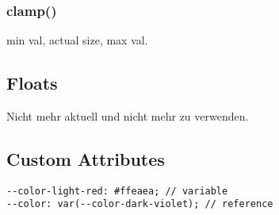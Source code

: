 \subsubsection{clamp()}
min val, actual size, max val. 

\subsection{Floats}
Nicht mehr aktuell und nicht mehr zu verwenden.

\subsection{Custom Attributes}
\begin{lstlisting}[style=htmlcssjs]
--color-light-red: #ffeaea; // variable
--color: var(--color-dark-violet); // reference
\end{lstlisting}






